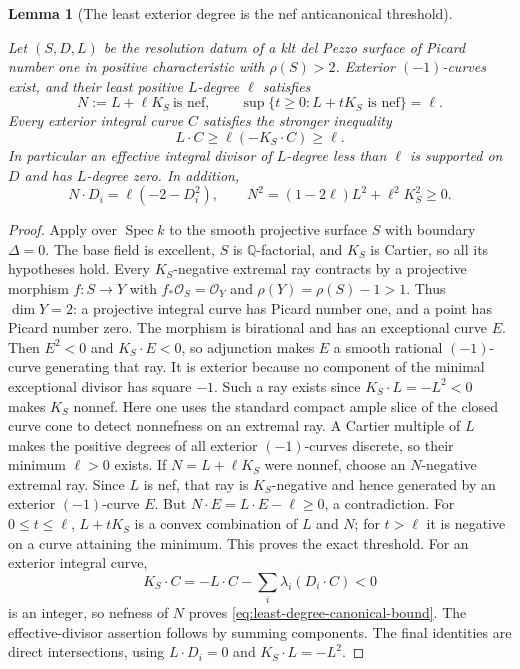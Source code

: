 \documentclass[11pt,reqno]{amsart}
\newtheorem{lemma}[lemma]{Lemma}
\theoremstyle{definition}
\theoremstyle{remark}
\newcommand{\QQ}{\mathbb Q}
\numberwithin{equation}{section}
\begin{document}
\begin{lemma}[The least exterior degree is the nef anticanonical threshold]
\label{lem:nef-threshold}

Let $(S,D,L)$ be the resolution datum of a klt del Pezzo surface of Picard number one
in positive characteristic with $\rho(S)>2$. Exterior $(-1)$-curves
exist, and their least positive $L$-degree $\ell$ satisfies
\[
 N:=L+\ell K_S\ \text{is nef},\qquad
 \sup\{t\ge0:L+tK_S\text{ is nef}\}=\ell.
\]
Every exterior integral curve $C$ satisfies the stronger inequality
\begin{equation}\label{eq:least-degree-canonical-bound}
 L\cdot C\ge\ell(-K_S\cdot C)\ge\ell.
\end{equation}
In particular an effective integral divisor of $L$-degree less than
$\ell$ is supported on $D$ and has $L$-degree zero. In addition,
\[
 N\cdot D_i=\ell(-2-D_i^2),\qquad
 N^2=(1-2\ell)L^2+\ell^2K_S^2\ge0.
\]

\end{lemma}

\begin{proof}
Apply \cite[Theorem~4.4]{Tanaka} over
$\operatorname{Spec}k$ to the smooth projective surface $S$ with
boundary $\Delta=0$. The base field is excellent, $S$ is
$\QQ$-factorial, and $K_S$ is Cartier, so all its hypotheses hold.
Every $K_S$-negative extremal ray contracts by a projective morphism
$f:S\to Y$ with $f_*\mathcal O_S=\mathcal O_Y$ and
$\rho(Y)=\rho(S)-1>1$. Thus $\dim Y=2$: a projective integral curve
has Picard number one, and a point has Picard number zero.
The morphism is birational and has an exceptional curve $E$.
Then $E^2<0$ and $K_S\cdot E<0$, so adjunction makes $E$ a smooth
rational $(-1)$-curve generating that ray. It is exterior because
no component of the minimal exceptional divisor has square $-1$.
Such a ray exists since $K_S\cdot L=-L^2<0$ makes $K_S$ nonnef.
Here one uses the standard compact ample slice of the closed curve
cone to detect nonnefness on an extremal ray.
A Cartier multiple of $L$ makes the positive degrees of all exterior
$(-1)$-curves discrete, so their minimum $\ell>0$ exists.
If $N=L+\ell K_S$ were nonnef, choose an $N$-negative extremal ray.
Since $L$ is nef, that ray is $K_S$-negative and hence generated by
an exterior $(-1)$-curve $E$. But
$N\cdot E=L\cdot E-\ell\ge0$, a contradiction.
For $0\le t\le\ell$, $L+tK_S$ is a convex combination of $L$ and $N$;
for $t>\ell$ it is negative on a curve attaining the minimum.
This proves the exact threshold. For an exterior integral curve,
\[
 K_S\cdot C=-L\cdot C-\sum_i\lambda_i(D_i\cdot C)<0
\]
is an integer, so nefness of $N$ proves
\eqref{eq:least-degree-canonical-bound}. The effective-divisor assertion
follows by summing components. The final identities are direct
intersections, using $L\cdot D_i=0$ and $K_S\cdot L=-L^2$.
\end{proof}
\end{document}
